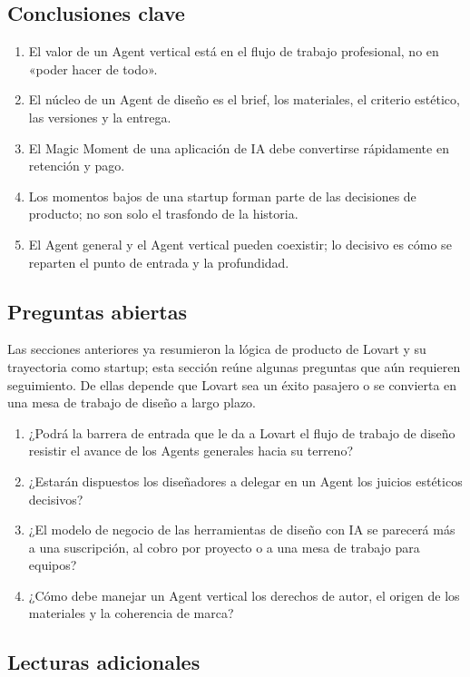 \subsection{Conclusiones clave}

\begin{enumerate}
\item El valor de un Agent vertical está en el flujo de trabajo profesional, no en «poder hacer de todo».
\item El núcleo de un Agent de diseño es el brief, los materiales, el criterio estético, las versiones y la entrega.
\item El Magic Moment de una aplicación de IA debe convertirse rápidamente en retención y pago.
\item Los momentos bajos de una startup forman parte de las decisiones de producto; no son solo el trasfondo de la historia.
\item El Agent general y el Agent vertical pueden coexistir; lo decisivo es cómo se reparten el punto de entrada y la profundidad.
\end{enumerate}

\subsection{Preguntas abiertas}

Las secciones anteriores ya resumieron la lógica de producto de Lovart y su trayectoria como startup; esta sección reúne algunas preguntas que aún requieren seguimiento. De ellas depende que Lovart sea un éxito pasajero o se convierta en una mesa de trabajo de diseño a largo plazo.

\begin{enumerate}
\item ¿Podrá la barrera de entrada que le da a Lovart el flujo de trabajo de diseño resistir el avance de los Agents generales hacia su terreno?
\item ¿Estarán dispuestos los diseñadores a delegar en un Agent los juicios estéticos decisivos?
\item ¿El modelo de negocio de las herramientas de diseño con IA se parecerá más a una suscripción, al cobro por proyecto o a una mesa de trabajo para equipos?
\item ¿Cómo debe manejar un Agent vertical los derechos de autor, el origen de los materiales y la coherencia de marca?
\end{enumerate}

\subsection{Lecturas adicionales}

